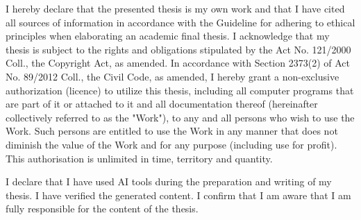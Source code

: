 \documentclass[english,bachelor,bw,unicode,oneside]{ctufit-thesis}
\begin{document}
\begin{declarationpage}
    I hereby declare that the presented thesis is my own work and that I have cited all sources of information in accordance with the Guideline for adhering to ethical principles when elaborating an academic final thesis.
    I acknowledge that my thesis is subject to the rights and obligations stipulated by the Act No. 121/2000 Coll., the Copyright Act, as amended. In accordance with Section 2373(2) of Act No. 89/2012 Coll., the Civil Code, as amended, I hereby grant a non-exclusive authorization (licence) to utilize this thesis, including all computer programs that are part of it or attached to it and all documentation thereof (hereinafter collectively referred to as the "Work"), to any and all persons who wish to use the Work. Such persons are entitled to use the Work in any manner that does not diminish the value of the Work and for any purpose (including use for profit). This authorisation is unlimited in time, territory and quantity.

    I declare that I have used AI tools during the preparation and writing of my thesis. I have verified the generated content. I confirm that I am aware that I am fully responsible for the content of the thesis.
\end{declarationpage}

\printtwopageabstract
\end{document}
